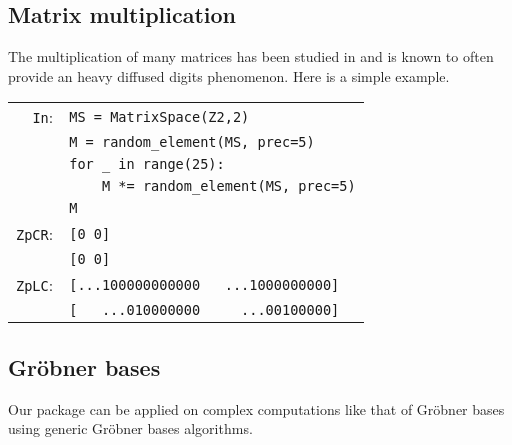 \documentclass[sigconf]{acmart}
\newcommand{\ZpFP}{\text{\color{output} \rm \tt ZpFP}\xspace}
\newcommand{\ZpL}{\text{\color{output} \rm \tt ZpL}\xspace}
\newcommand{\ZpLC}{\text{\color{output} \rm \tt ZpLC}\xspace}
\newcommand{\cIn}{{\color{input} \tt \phantom{Zp}In}:}
\newcommand{\cZpCR}{{\color{output} \tt ZpCR}:}
\newcommand{\cZpLC}{{\color{output} \tt ZpLC}:}
\theoremstyle{definition}
\begin{document}
\subsection{Matrix multiplication}
The multiplication of many matrices has been studied
in \citep{caruso-roe-vaccon:15} and is known to often 
provide an heavy diffused digits phenomenon.
Here is a simple example.

\smallskip

{\noindent \small
\begin{tabular}{rl}
\cIn
 & \verb?MS = ?{\color{constructor}\verb?MatrixSpace?}\verb?(?{\color{ring}\verb?Z2?}\verb?,2)? \\
 & \verb?M = ?{\color{function}\verb?random_element?}\verb?(MS, prec=5)? \\
 & \verb?for _ in range(25):? \\
 & \verb?    M *= ?{\color{function}\verb?random_element?}\verb?(MS, prec=5)? \\
 & \verb?M? \\
\cZpCR
 & \verb?[0 0]? \\
 & \verb?[0 0]? \\
\cZpLC
 & \verb?[...100000000000   ...1000000000]? \\
 & \verb?[   ...010000000     ...00100000]? \\
\end{tabular}}



\subsection{Gröbner bases}
Our package can be applied 
on complex computations like that of
Gröbner bases using generic
Gröbner bases algorithms.

\smallskip
\end{document}
